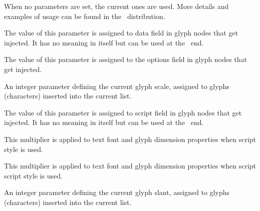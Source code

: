 \startlinecorrection
\dontleavehmode\getbuffer
\stoplinecorrection

When no parameters are set, the current ones are used. More details and examples
of usage can be found in the \CONTEXT\ distribution.

\stopnewprimitive

\startnewprimitive[title={\prm {glyphdatafield}}]

The value of this parameter is assigned to data field in glyph nodes that get
injected. It has no meaning in itself but can be used at the \LUA\ end.

\stopnewprimitive

\startnewprimitive[title={\prm {glyphoptions}}]

The value of this parameter is assigned to the options field in glyph nodes that
get injected.

\starttworows
{}
\stoptworows

\stopnewprimitive

\startnewprimitive[title={\prm {glyphscale}}]

An integer parameter defining the current glyph scale, assigned to glyphs
(characters) inserted into the current list.

\stopnewprimitive

\startnewprimitive[title={\prm {glyphscriptfield}}]

The value of this parameter is assigned to script field in glyph nodes that get
injected. It has no meaning in itself but can be used at the \LUA\ end.

\stopnewprimitive

\startnewprimitive[title={\prm {glyphscriptscale}}]

This multiplier is applied to text font and glyph dimension properties when script
style is used.

\stopnewprimitive

\startnewprimitive[title={\prm {glyphscriptscriptscale}}]

This multiplier is applied to text font and glyph dimension properties when
script script style is used.

\stopnewprimitive

\startnewprimitive[title={\prm {glyphslant}}]

An integer parameter defining the current glyph slant, assigned to glyphs
(characters) inserted into the current list.

\stopnewprimitive

